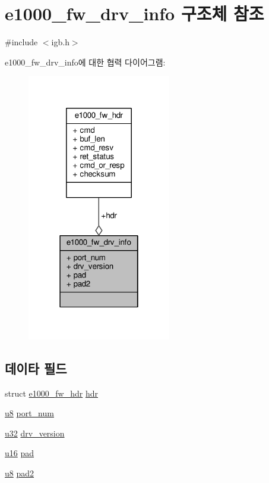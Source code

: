 \hypertarget{structe1000__fw__drv__info}{}\section{e1000\+\_\+fw\+\_\+drv\+\_\+info 구조체 참조}
\label{structe1000__fw__drv__info}


{\ttfamily \#include $<$igb.\+h$>$}



e1000\+\_\+fw\+\_\+drv\+\_\+info에 대한 협력 다이어그램\+:
\nopagebreak
\begin{figure}[H]
\begin{center}
\leavevmode
\includegraphics[width=178pt]{structe1000__fw__drv__info__coll__graph}
\end{center}
\end{figure}
\subsection*{데이타 필드}
\begin{DoxyCompactItemize}
\item 
struct \hyperlink{structe1000__fw__hdr}{e1000\+\_\+fw\+\_\+hdr} \hyperlink{structe1000__fw__drv__info_a9367eb5902c7a6fbc3272c5a4d9f9377}{hdr}
\item 
\hyperlink{lib_2igb_2e1000__osdep_8h_a8baca7e76da9e0e11ce3a275dd19130c}{u8} \hyperlink{structe1000__fw__drv__info_ab89764d4931eca8a703e4864c390e725}{port\+\_\+num}
\item 
\hyperlink{lib_2igb_2e1000__osdep_8h_a64e91c10a0d8fb627e92932050284264}{u32} \hyperlink{structe1000__fw__drv__info_aa15718f16403ba5603b39529c4e6617e}{drv\+\_\+version}
\item 
\hyperlink{lib_2igb_2e1000__osdep_8h_acdc9cf0314be0ae5a01d6d4379a95edd}{u16} \hyperlink{structe1000__fw__drv__info_aa94b12c4dc26f2a62469a0e89f216cf9}{pad}
\item 
\hyperlink{lib_2igb_2e1000__osdep_8h_a8baca7e76da9e0e11ce3a275dd19130c}{u8} \hyperlink{structe1000__fw__drv__info_a3ff067b94e2ab4a981c90c8a7920c521}{pad2}
\end{DoxyCompactItemize}


